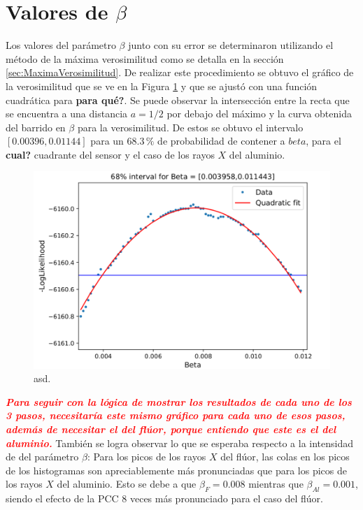 \section{Valores de \texorpdfstring{$\beta$}{beta}}
\noindent Los valores del parámetro $\beta$ junto con su error se determinaron utilizando el método de la máxima verosimilitud como se detalla en la sección \ref{sec:MaximaVerosimilitud}. De realizar este procedimiento se obtuvo el gráfico de la verosimilitud que se ve en la Figura \ref{fig:LL_beta} y que se ajustó con una función cuadrática para \textbf{para qué?}. Se puede observar la intersección entre la recta que se encuentra a una distancia $a=1/2$ por debajo del máximo y la curva obtenida del barrido en $\beta$ para la verosimilitud. De estos se obtuvo el intervalo $[0.00396, 0.01144]$ para un $68.3\,\%$ de probabilidad de contener a $beta$, para el \textbf{cual?} cuadrante del sensor y el caso de los rayos $X$ del aluminio.
\begin{figure}[H]
    \centering
        \includegraphics[scale=0.4]{pngs/LL_beta.png}
    \caption{\footnotesize{asd.}}
    \label{fig:LL_beta}
\end{figure}
\textcolor{red}{\textbf{\textit{Para seguir con la lógica de mostrar los resultados de cada uno de los 3 pasos, necesitaría este mismo gráfico para cada uno de esos pasos, además de necesitar el del flúor, porque entiendo que este es el del aluminio.}}}
También se logra observar lo que se esperaba respecto a la intensidad de del parámetro $\beta$: Para los picos de los rayos $X$ del flúor, las colas en los picos de los histogramas son apreciablemente más pronunciadas que para los picos de los rayos $X$ del aluminio. Esto se debe a que $\beta_{F} = 0.008$ mientras que $\beta_{Al} = 0.001$, siendo el efecto de la PCC 8 veces más pronunciado para el caso del flúor.

